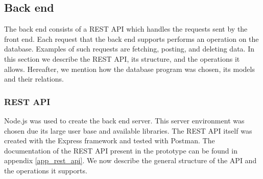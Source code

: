     \subsection{Back end}

    The back end consists of a REST API which handles the requests sent by the front end. Each request that the back end supports performs an operation on the database. Examples of such requests are fetching, posting, and deleting data. In this section we describe the REST API, its structure, and the operations it allows. Hereafter, we mention how the database program was chosen, its models and their relations.

        \subsubsection{REST API}

        Node.js was used to create the back end server. This server environment was chosen due its large user base and available libraries. The REST API itself was created with the Express framework and tested with Postman. The documentation of the REST API present in the prototype can be found in appendix \ref{app_rest_api}. We now describe the general structure of the API and the operations it supports.

